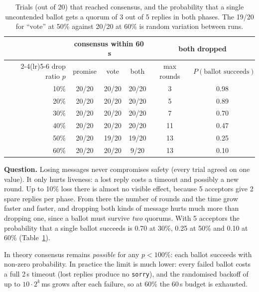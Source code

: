 \documentclass[a4paper, 10pt]{article}
\begin{document}
\begin{table}[H]
\centering
\begin{tabular}{rccccc}
\toprule
& \multicolumn{3}{c}{consensus within 60\,s} & \multicolumn{2}{c}{both dropped} \\
\cmidrule(lr){2-4}\cmidrule(lr){5-6}
drop ratio $p$ & promise & vote & both & max rounds & $P(\text{ballot succeeds})$ \\
\midrule
10\% & 20/20 & 20/20 & 20/20 & 3  & 0.98 \\
20\% & 20/20 & 20/20 & 20/20 & 5  & 0.89 \\
30\% & 20/20 & 20/20 & 20/20 & 7  & 0.70 \\
40\% & 20/20 & 20/20 & 20/20 & 11 & 0.47 \\
50\% & 20/20 & 19/20 & 19/20 & 13 & 0.25 \\
60\% & 20/20 & 20/20 & 9/20  & 13 & 0.10 \\
\bottomrule
\end{tabular}
\caption{Trials (out of 20) that reached consensus, and the probability that a single uncontended ballot gets a quorum of 3 out of 5 replies in both phases. The 19/20 for ``vote'' at 50\% against 20/20 at 60\% is random variation between runs.}
\label{tab:drop}
\end{table}

\textbf{Question.} Losing messages never compromises safety (every trial agreed on one value). It only hurts liveness: a lost reply costs a timeout and possibly a new round. Up to 10\% loss there is almost no visible effect, because 5 acceptors give 2 spare replies per phase. From there the number of rounds and the time grow faster and faster, and dropping both kinds of message hurts much more than dropping one, since a ballot must survive \emph{two} quorums. With 5 acceptors the probability that a single ballot succeeds is 0.70 at 30\%, 0.25 at 50\% and 0.10 at 60\% (Table~\ref{tab:drop}).

In theory consensus remains \emph{possible} for any $p<100\%$: each ballot succeeds with non-zero probability. In practice the limit is much lower: every failed ballot costs a full 2\,s timeout (lost replies produce no \texttt{sorry}), and the randomised backoff of up to $10\cdot2^{k}$\,ms grows after each failure, so at 60\% the 60\,s budget is exhausted.

\end{document}
